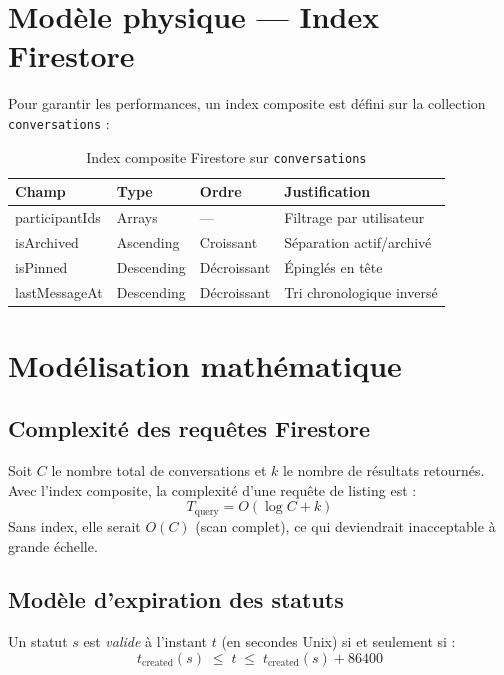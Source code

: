 \documentclass[12pt,a4paper]{report}
\begin{document}
\section{Modèle physique --- Index Firestore}

Pour garantir les performances, un index composite est défini sur la collection \texttt{conversations} :

\begin{table}[H]
\centering
\caption{Index composite Firestore sur \texttt{conversations}}
\label{tab:index}
\renewcommand{\arraystretch}{1.3}
\begin{tabular}{@{}llll@{}}
\toprule
\textbf{Champ} & \textbf{Type} & \textbf{Ordre} & \textbf{Justification}\\\midrule
participantIds & Arrays     & ---          & Filtrage par utilisateur    \\
isArchived     & Ascending  & Croissant    & Séparation actif/archivé    \\
isPinned       & Descending & Décroissant  & Épinglés en tête            \\
lastMessageAt  & Descending & Décroissant  & Tri chronologique inversé   \\
\bottomrule
\end{tabular}
\end{table}

\section{Modélisation mathématique}

\subsection{Complexité des requêtes Firestore}

Soit $C$ le nombre total de conversations et $k$ le nombre de résultats retournés.
Avec l'index composite, la complexité d'une requête de listing est :
\[
  T_{\text{query}} = O(\log C + k)
\]
Sans index, elle serait $O(C)$ (scan complet), ce qui deviendrait inacceptable à grande échelle.

\subsection{Modèle d'expiration des statuts}

Un statut $s$ est \emph{valide} à l'instant $t$ (en secondes Unix) si et seulement si :
\[
  t_{\text{created}}(s) \;\leq\; t \;\leq\; t_{\text{created}}(s) + 86400
\]
\end{document}
